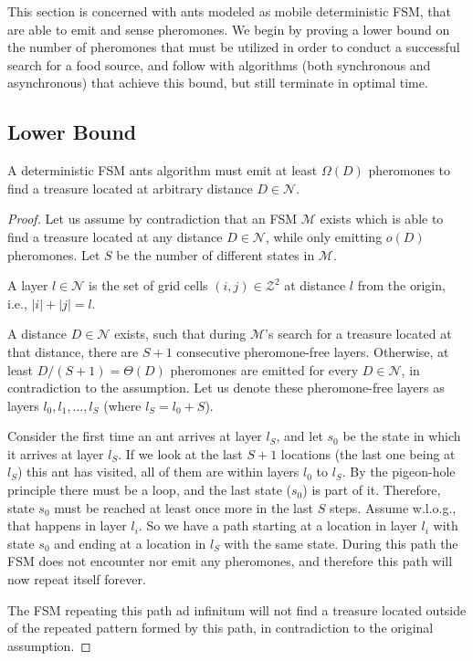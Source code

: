 

This section is concerned with ants modeled as mobile deterministic FSM, that are able to emit and
sense pheromones. We begin by proving a lower bound on the number of pheromones 
that must be utilized in order to conduct a successful search for a food source, 
and follow with algorithms (both synchronous and asynchronous) that achieve this bound, 
but still terminate in optimal time.

\subsection{Lower Bound}

\begin{theorem}\label{thm:fsm}
A deterministic FSM ants algorithm must emit at least $\Omega(D)$ pheromones to find a treasure located at arbitrary distance $D \in \mathcal{N}$.
\end{theorem}

\begin{proof}
Let us assume by contradiction that an FSM $\mathcal{M}$ exists which is able to find a
 treasure located at any distance $D \in \mathcal{N}$, while only emitting $o(D)$ pheromones.
Let $S$ be the number of different states in $\mathcal{M}$.

\begin{definition}[Layer]
A layer $l \in \mathcal{N}$ is the set of grid cells $(i, j) \in \mathcal{Z}^2$ at distance $l$ from
the origin, i.e., $|i| + |j| = l$.
\end{definition}

A distance $D \in \mathcal{N}$ exists, such that during $\mathcal{M}$'s search for a 
treasure located at that distance, there are $S+1$ consecutive pheromone-free layers.
 Otherwise, at least
$D/(S+1) = \Theta(D)$ pheromones are emitted for every $D \in \mathcal{N}$, in contradiction to the assumption. Let us denote these pheromone-free layers as layers $l_0, l_1, \dots, l_S$ 
(where $l_S = l_0 + S$).

Consider the first time an ant arrives at layer $l_S$, and let $s_0$ be the state in which it arrives at layer $l_S$.
If we look
at the last $S+1$ locations (the last one being at $l_S$) this ant has visited, all of them are within layers $l_0$ to
$l_S$. By the pigeon-hole principle there must be a loop, and the last state ($s_0$) is part of it.
Therefore, state $s_0$ must be reached at least once more in the last $S$ steps. Assume
w.l.o.g., that happens in layer $l_i$. So we have a path starting at a location in layer $l_i$ with state
 $s_0$ and ending
 at a location in $l_S$ with the same state. During this path the FSM does not encounter nor emit any
pheromones, and therefore this path will now repeat itself forever.

The FSM repeating this path ad infinitum will not find a treasure located outside
of the repeated pattern formed by this path, in contradiction to the original assumption.
\end{proof}

